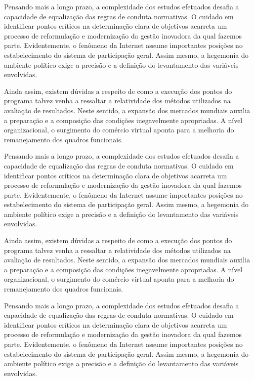 \documentclass[fleqn]{icat-ufal}
\begin{document}
Pensando mais a longo prazo, a complexidade dos estudos efetuados desafia a
capacidade de equalização das regras de conduta normativas. O cuidado em
identificar pontos críticos na determinação clara de objetivos acarreta um
processo de reformulação e modernização da gestão inovadora da qual fazemos
parte. Evidentemente, o fenômeno da Internet assume importantes posições no
estabelecimento do sistema de participação geral. Assim mesmo, a hegemonia do
ambiente político exige a precisão e a definição do levantamento das variáveis
envolvidas. 

Ainda assim, existem dúvidas a respeito de como a execução dos pontos do
programa talvez venha a ressaltar a relatividade dos métodos utilizados na
avaliação de resultados. Neste sentido, a expansão dos mercados mundiais auxilia
a preparação e a composição das condições inegavelmente apropriadas. A nível
organizacional, o surgimento do comércio virtual aponta para a melhoria do
remanejamento dos quadros funcionais. 

Pensando mais a longo prazo, a complexidade dos estudos efetuados desafia a
capacidade de equalização das regras de conduta normativas. O cuidado em
identificar pontos críticos na determinação clara de objetivos acarreta um
processo de reformulação e modernização da gestão inovadora da qual fazemos
parte. Evidentemente, o fenômeno da Internet assume importantes posições no
estabelecimento do sistema de participação geral. Assim mesmo, a hegemonia do
ambiente político exige a precisão e a definição do levantamento das variáveis
envolvidas. 

Ainda assim, existem dúvidas a respeito de como a execução dos pontos do
programa talvez venha a ressaltar a relatividade dos métodos utilizados na
avaliação de resultados. Neste sentido, a expansão dos mercados mundiais auxilia
a preparação e a composição das condições inegavelmente apropriadas. A nível
organizacional, o surgimento do comércio virtual aponta para a melhoria do
remanejamento dos quadros funcionais. 

Pensando mais a longo prazo, a complexidade dos estudos efetuados desafia a
capacidade de equalização das regras de conduta normativas. O cuidado em
identificar pontos críticos na determinação clara de objetivos acarreta um
processo de reformulação e modernização da gestão inovadora da qual fazemos
parte. Evidentemente, o fenômeno da Internet assume importantes posições no
estabelecimento do sistema de participação geral. Assim mesmo, a hegemonia do
ambiente político exige a precisão e a definição do levantamento das variáveis
envolvidas. 

\end{document}
